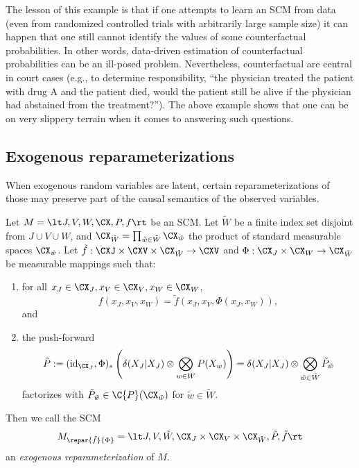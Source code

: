 The lesson of this example is that if one attempts to learn an SCM from data (even from randomized controlled trials with arbitrarily large sample size) it can happen that one still cannot identify the values of some counterfactual probabilities. 
In other words, data-driven estimation of counterfactual probabilities can be an ill-posed problem. 
Nevertheless, counterfactual are central in court cases (e.g., to determine responsibility, ``the physician treated the patient with drug A and the patient died, would the patient still be alive if the physician had abstained from the treatment?''). 
The above example shows that one can be on very slippery terrain when it comes to answering such questions. 

\subsection{Exogenous reparameterizations}

When exogenous random variables are latent, certain reparameterizations of those may preserve part of the causal semantics of the observed variables.
\begin{Def}\label{def:exogenous_reparameterization}
  Let $M = \lt J, V, W, \CX, P, f \rt$ be an SCM.
  Let $\tilde{W}$ be a finite index set disjoint from $J \cup V \cup W$, and
  $\CX_{\tilde{W}} = \prod_{\tilde{w}\in\tilde{W}} \CX_{\tilde{w}}$ the product of standard measurable spaces $\CX_{\tilde{w}}$. 
  Let $\tilde{f} : \CXJ \times \CXV \times \CX_{\tilde{W}} \to \CXV$ and $\Phi : \CX_J \times \CX_W \to \CX_{\tilde{W}}$ be measurable mappings such that:
  \begin{enumerate}[label=\roman*)]
    \item for all $x_J \in \CX_J, x_V \in \CX_V, x_W \in \CX_W$,
    $$f(x_J,x_V,x_W) = \tilde{f}(x_J,x_V,\Phi(x_J,x_W)),$$
    and
    \item the push-forward 
      $$\tilde{P} := (\id_{\CX_J}, \Phi)_* \lp \delta(X_J|X_J) \otimes \bigotimes_{w\in W}P(X_w) \rp = \delta(X_J|X_J) \otimes \bigotimes_{\tilde{w}\in\tilde{W}} \tilde{P}_{\tilde{w}}$$
    factorizes with $\tilde{P}_{\tilde{w}} \in \C{P}(\CX_{\tilde{w}})$ for $\tilde{w}\in\tilde{W}$.
  \end{enumerate}
  Then we call the SCM
  $$M_{\repar{\tilde{f}}{\Phi}} = \lt J, V, \tilde{W}, \CX_J \times \CX_V \times \CX_{\tilde{W}}, \tilde{P}, \tilde{f} \rt$$
  an \emph{exogenous reparameterization} of $M$.
\end{Def}

